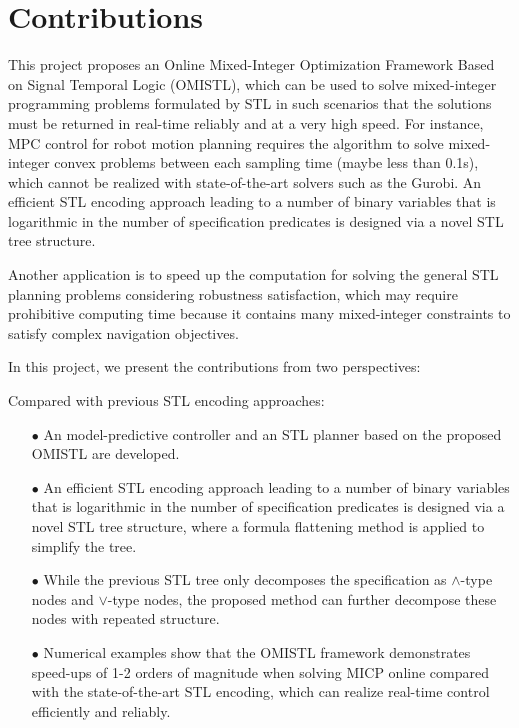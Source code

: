 \documentclass[a4paper]{report}
\begin{document}
\section{Contributions}

This project proposes an Online Mixed-Integer Optimization Framework Based on Signal Temporal Logic (OMISTL), which can be used to solve mixed-integer programming problems formulated by STL in such scenarios that the solutions must be returned in real-time reliably and at a very high speed. For instance, MPC control for robot motion planning requires the algorithm to solve mixed-integer convex problems between each sampling time (maybe less than 0.1s), which cannot be realized with state-of-the-art solvers such as the Gurobi. An efficient STL encoding approach leading to a number of binary variables that is logarithmic in the number of specification predicates is designed via a novel STL tree structure.

Another application is to speed up the computation for solving the general STL planning problems considering robustness satisfaction, which may require prohibitive computing time because it contains many mixed-integer constraints to satisfy complex navigation objectives.

In this project, we present the contributions from two perspectives:

Compared with previous STL encoding approaches:

\begin{itemize}
    \item[$\bullet$]An model-predictive controller and an STL planner based on the proposed OMISTL are developed. 
    \end{itemize}

    \begin{itemize}
        \item[$\bullet$]An efficient STL encoding approach leading to a number of binary variables that is logarithmic in the number of specification predicates is designed via a novel STL tree structure, where a formula flattening method is applied to simplify the tree.
        \end{itemize}

    \begin{itemize}
        \item[$\bullet$]While the previous STL tree only decomposes the specification as $\wedge$-type nodes and $\vee$-type nodes, the proposed method can further decompose these nodes with repeated structure.
            \end{itemize}
    \begin{itemize} 
        \item[$\bullet$]Numerical examples show that the OMISTL framework demonstrates speed-ups of 1-2 orders of magnitude when solving MICP online compared with the state-of-the-art STL encoding, which
        can realize real-time control efficiently and reliably.
    \end{itemize}
\end{document}
